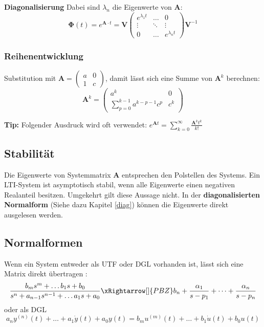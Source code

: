 \textbf{Diagonalisierung}
Dabei sind $\lambda_n$ die Eigenwerte von $\mathbf{A}$:
\[
\mathbf{\Phi}(t) = e^{\mathbf{A}\cdot t} = \mathbf{V}\begin{pmatrix}
	e^{\lambda_1t} & \dots & 0 \\
	\vdots & \ddots & \vdots \\
	0 & \dots & 	e^{\lambda_nt}
\end{pmatrix}\mathbf{V}^{-1}
\]

\subsubsection{Reihenentwicklung}
Substitution mit $\mathbf{A} = \begin{pmatrix}
	a & 0 \\ 1 & c
\end{pmatrix}$, damit lässt sich eine Summe von $\mathbf{A}^k$ berechnen:
\[
\mathbf{A}^k = \begin{pmatrix}
	a^k & 0 \\
	\sum\limits_{p = 0}^{k - 1}a^{k-p-1}c^p & c^k
\end{pmatrix}
\]

\textbf{Tip:} Folgender Ausdruck wird oft verwendet: $e^{\mathbf{A}t} = \sum\limits_{k=0}^{\infty}\frac{\mathbf{A}^kt^k}{k!}$

\subsection{Stabilität}
Die Eigenwerte von Systemmatrix $\mathbf{A}$ entsprechen den Polstellen des Systems. Ein LTI-System ist asymptotisch stabil, wenn alle Eigenwerte einen negativen Realanteil besitzen. Umgekehrt gilt diese Aussage nicht. In der \textbf{diagonalisierten Normalform} (Siehe dazu Kapitel \ref{diag}) können die Eigenwerte direkt ausgelesen werden. 

\subsection{Normalformen}
Wenn ein System entweder als UTF oder DGL vorhanden ist, lässt sich eine Matrix direkt übertragen :
\[
\frac{b_{m}s^{m} + \dots b_1s + b_0}{s^n + a_{n-1}s^{n-1} + \dots a_1s + a_0} \xRightarrow[]{PBZ} b_n + \frac{\alpha_1}{s - p_1} + \dots + \frac{\alpha_n}{s - p_n}
\]
oder als DGL \[
a_ny^{(n)}(t) + \dots + a_1\dot{y}(t) + a_0y(t) = b_mu^{(m)}(t) + \dots + b_1\dot{u}(t) + b_0u(t)
\]

